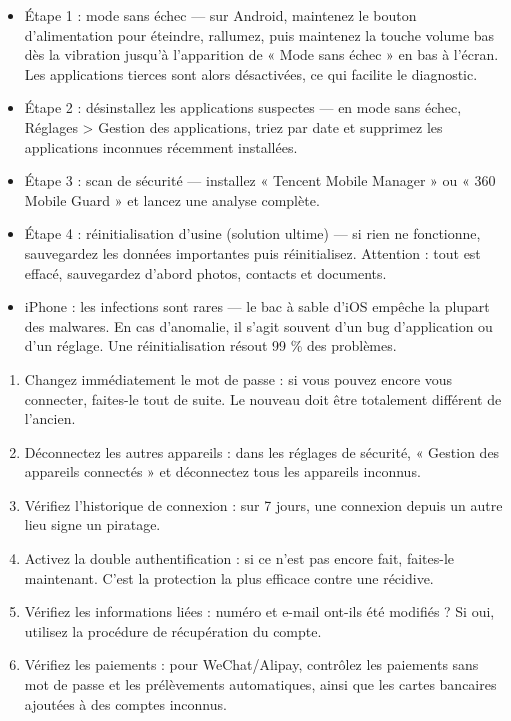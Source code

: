 \begin{itemize}
  \item Étape 1 : mode sans échec — sur Android, maintenez le bouton d'alimentation pour éteindre, rallumez, puis maintenez la touche volume bas dès la vibration jusqu'à l'apparition de « Mode sans échec » en bas à l'écran. Les applications tierces sont alors désactivées, ce qui facilite le diagnostic.
  \item Étape 2 : désinstallez les applications suspectes — en mode sans échec, Réglages > Gestion des applications, triez par date et supprimez les applications inconnues récemment installées.
  \item Étape 3 : scan de sécurité — installez « Tencent Mobile Manager » ou « 360 Mobile Guard » et lancez une analyse complète.
  \item Étape 4 : réinitialisation d'usine (solution ultime) — si rien ne fonctionne, sauvegardez les données importantes puis réinitialisez. Attention : tout est effacé, sauvegardez d'abord photos, contacts et documents.
  \item iPhone : les infections sont rares — le bac à sable d'iOS empêche la plupart des malwares. En cas d'anomalie, il s'agit souvent d'un bug d'application ou d'un réglage. Une réinitialisation résout 99 \% des problèmes.
\end{itemize}


\begin{enumerate}
  \item Changez immédiatement le mot de passe : si vous pouvez encore vous connecter, faites-le tout de suite. Le nouveau doit être totalement différent de l'ancien.
  \item Déconnectez les autres appareils : dans les réglages de sécurité, « Gestion des appareils connectés » et déconnectez tous les appareils inconnus.
  \item Vérifiez l'historique de connexion : sur 7 jours, une connexion depuis un autre lieu signe un piratage.
  \item Activez la double authentification : si ce n'est pas encore fait, faites-le maintenant. C'est la protection la plus efficace contre une récidive.
  \item Vérifiez les informations liées : numéro et e-mail ont-ils été modifiés ? Si oui, utilisez la procédure de récupération du compte.
  \item Vérifiez les paiements : pour WeChat/Alipay, contrôlez les paiements sans mot de passe et les prélèvements automatiques, ainsi que les cartes bancaires ajoutées à des comptes inconnus.
\end{enumerate}

